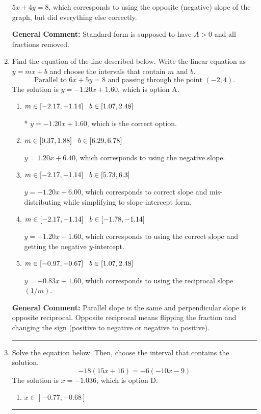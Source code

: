 \documentclass{extbook}[14pt]
\newcommand{\litem}[1]{\item #1

\rule{\textwidth}{0.4pt}}
\begin{document}
\begin{enumerate}
{\begin{enumerate}[label=\Alph*.]
 $5x + 4y = 8$, which corresponds to using the opposite (negative) slope of the graph, but did everything else correctly.
\end{enumerate}

\textbf{General Comment:} Standard form is supposed to have $A > 0$ and all fractions removed.
}
\litem{
Find the equation of the line described below. Write the linear equation as $ y=mx+b $ and choose the intervals that contain $m$ and $b$.
\[ \text{Parallel to } 6 x + 5 y = 8 \text{ and passing through the point } (-2, 4). \]The solution is \( y = -1.20x + 1.60 \), which is option A.\begin{enumerate}[label=\Alph*.]
\item \( m \in [-2.17, -1.14] \hspace*{3mm} b \in [1.07, 2.48] \)

* $y = -1.20x + 1.60$, which is the correct option.
\item \( m \in [0.37, 1.88] \hspace*{3mm} b \in [6.29, 6.78] \)

 $y = 1.20x + 6.40$, which corresponds to using the negative slope.
\item \( m \in [-2.17, -1.14] \hspace*{3mm} b \in [5.73, 6.3] \)

 $y = -1.20x + 6.00$, which corresponds to correct slope and mis-distributing while simplifying to slope-intercept form.
\item \( m \in [-2.17, -1.14] \hspace*{3mm} b \in [-1.78, -1.14] \)

 $y = -1.20x - 1.60$, which corresponds to using the correct slope and getting the negative $y$-intercept.
\item \( m \in [-0.97, -0.67] \hspace*{3mm} b \in [1.07, 2.48] \)

 $y = -0.83x + 1.60$, which corresponds to using the reciprocal slope $(1/m)$.
\end{enumerate}

\textbf{General Comment:} Parallel slope is the same and perpendicular slope is opposite reciprocal. Opposite reciprocal means flipping the fraction and changing the sign (positive to negative or negative to positive).
}
\litem{
Solve the equation below. Then, choose the interval that contains the solution.
\[ -18(15x + 16) = -6(-10x -9) \]The solution is \( x = -1.036 \), which is option D.\begin{enumerate}[label=\Alph*.]
\item \( x \in [-0.77, -0.68] \)


\end{enumerate}}
\end{enumerate}
\end{document}
